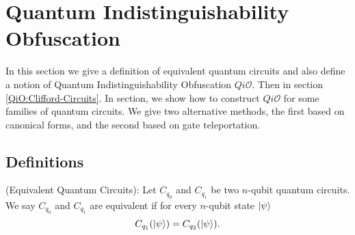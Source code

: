 
\section{Quantum Indistinguishability Obfuscation}
\label{sec:QiO-Cliffords and more}
In this section we give a definition of equivalent quantum circuits and also define a notion of Quantum Indistinguishability Obfuscation $Qi\mathcal{O}.$ Then in section \ref{QiO:Clifford-Circuits}. In section, we show how to construct $Qi\mathcal{O}$ for some families of quantum circuits. We give two alternative methods, the first based on canonical forms, and the second based on gate teleportation. 


\subsection{Definitions}
\label{sec:iO-Cliffords and more}
\begin{definition} {\rm (Equivalent Quantum Circuits):}
\label{def:eqcircuit}
Let $C_{q_0}$ and $C_{q_1}$ be two $n$-qubit quantum circuits. We say $C_{q_0}$ and $C_{q_1}$ are equivalent if for every $n$-qubit state ${\lvert}\psi\rangle$
$$C_{q_1}({\lvert}\psi\rangle) =C_{q_2}({\lvert}\psi\rangle).$$
\end{definition}

